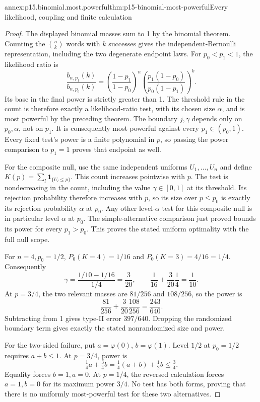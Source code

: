 \begin{annexitem}{annex:p15.binomial.most.powerful}{thm:p15-binomial-most-powerful}{Every likelihood, coupling and finite calculation}
\begin{proof}
The displayed binomial masses sum to 1
by the binomial theorem. Counting the
\(\binom nk\) words with \(k\) successes
gives the independent-Bernoulli representation,
including the two degenerate endpoint laws.
For \(p_0<p_1<1\), the likelihood ratio is
\[
 \frac{b_{n,p_1}(k)}{b_{n,p_0}(k)}
 =\left(\frac{1-p_1}{1-p_0}\right)^n
  \left(\frac{p_1(1-p_0)}{p_0(1-p_1)}\right)^k.
\]
Its base in the final power is strictly
greater than 1. The threshold rule in
the count is therefore exactly a
likelihood-ratio test, with its chosen
size \(\alpha\), and is most powerful
by the preceding theorem.
The boundary \(j,\gamma\) depends only
on \(p_0,\alpha\), not on \(p_1\).
It is consequently most powerful
against every \(p_1\in(p_0,1)\).
Every fixed test's power is a finite
polynomial in \(p\), so passing the
power comparison to \(p_1=1\)
proves that endpoint as well.

For the composite null, use the same
independent uniforms \(U_1,\ldots,U_n\)
and define
\(K(p)=\sum_l\mathbf1_{\{U_l\leq p\}}\).
This count increases pointwise with
\(p\). The test is nondecreasing in
the count, including the value
\(\gamma\in[0,1]\) at its threshold.
Its rejection probability therefore
increases with \(p\), so its size
over \(p\leq p_0\) is exactly
its rejection probability \(\alpha\)
at \(p_0\). Any other level-\(\alpha\)
test for this composite null is
in particular level \(\alpha\)
at \(p_0\). The simple-alternative
comparison just proved bounds its
power for every \(p_1>p_0\).
This proves the stated uniform
optimality with the full null scope.

For \(n=4,p_0=1/2\),
\(P_0(K=4)=1/16\) and
\(P_0(K=3)=4/16=1/4\).
Consequently
\[
 \gamma=\frac{1/10-1/16}{1/4}=\frac3{20},
 \qquad \frac1{16}+\frac3{20}\frac14=\frac1{10}.
\]
At \(p=3/4\), the two relevant
masses are \(81/256\) and
\(108/256\), so the power is
\[
               \frac{81}{256}
                    +\frac3{20}\frac{108}{256}
                   =\frac{243}{640}.
\]
Subtracting from 1 gives type-II
error \(397/640\).
Dropping the randomized boundary
term gives exactly the stated
nonrandomized size and power.

For the two-sided failure, put
\(a=\varphi(0)\), \(b=\varphi(1)\).
Level \(1/2\) at \(p_0=1/2\)
requires \(a+b\leq1\).
At \(p=3/4\), power is
\[
                  \tfrac14a+\tfrac34b
                    =\tfrac14(a+b)+\tfrac12b\leq\tfrac34.
\]
Equality forces \(b=1,a=0\).
At \(p=1/4\), the reversed
calculation forces \(a=1,b=0\)
for its maximum power \(3/4\).
No test has both forms, proving
that there is no uniformly most-powerful
test for these two alternatives.
\end{proof}
\end{annexitem}

